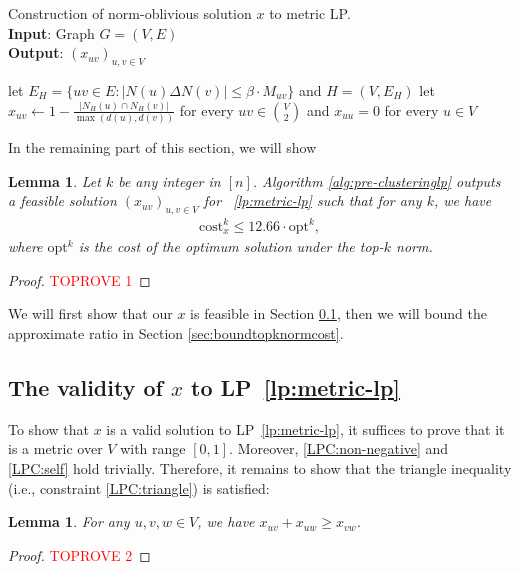 \documentclass[11pt]{article}
\newcommand{\cost}{\mathrm{cost}}
\newtheorem{lemma}[theorem]{Lemma}
\newcommand{\opt}{{\mathrm{opt}}}
\begin{document}
\begin{CJK*}{UTF8}{gbsn}
\begin{algorithm}[t]
    \caption{Construction of norm-oblivious solution $x$ to metric LP. \\
     \textbf{Input}: Graph $G = (V, E)$\\
\textbf{Output}: $(x_{uv})_{u, v \in V} $ }
\label{alg:pre-clusteringlp}
    \begin{algorithmic}[1]
    \State let $E_H = \{uv \in E: |N(u) \Delta N(v)| \leq \beta \cdot M_{uv}\}$ and $H = (V, E_H)$
 \label{alg:pre-clusteringlpfirst}
    \State let $x_{uv} \leftarrow 1 - \frac{|N_{H}(u) \cap N_{H}(v)|}{\mathrm{\max}(d(u), d(v))}$ for every $uv \in {V \choose 2}$ and $x_{uu} = 0$ for every $u \in V$
    \EndFunction
\end{algorithmic}    
\end{algorithm}

In the remaining part of this section, we will show 
\begin{lemma}
\label{lemma:boundratiomain}
Let $k$ be any integer in $[n]$. 
Algorithm \ref{alg:pre-clusteringlp} outputs a feasible solution $(x_{uv})_{u, v \in V}$ for ~\eqref{lp:metric-lp} such that for any $k$, we have
\begin{align*}
    \cost^k_x \leq 12.66 \cdot \opt^k, 
\end{align*}
where $\opt^k$ is the cost of the optimum solution under the top-$k$ norm. 
\end{lemma}

\begin{proof}\textcolor{red}{TOPROVE 1}\end{proof}

We will first show that our $x$ is feasible in Section \ref{sec:xismetric}, then we will bound the approximate ratio in Section \ref{sec:boundtopknormcost}.


\subsection{The validity of $x$ to LP~\eqref{lp:metric-lp}}
\label{sec:xismetric}
To show that $x$ is a valid solution to LP~\eqref{lp:metric-lp}, it suffices to prove that it is a metric over $V$ with range $[0, 1]$. Moreover, \eqref{LPC:non-negative} and \eqref{LPC:self} hold trivially. Therefore, it remains to show that the triangle inequality (i.e., constraint \eqref{LPC:triangle}) is satisfied: 
\begin{lemma}
\label{lemma:metric}
For any $u,v,w \in V$, we have 
    $x_{uv} + x_{uw} \geq x_{vw}$.
\end{lemma}
\begin{proof}\textcolor{red}{TOPROVE 2}\end{proof}




\end{CJK*}
\end{document}
